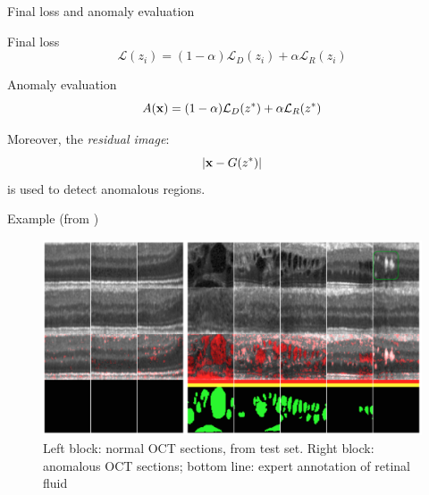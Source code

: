 \documentclass[xcolor=pdftex,dvipsnames,table,mathserif]{beamer}
\begin{document}
\begin{frame}{Final loss and anomaly evaluation}

  \begin{block}{Final loss}
    \[\mathcal{L}(z_i) = (1-\alpha)\mathcal{L}_D(z_i) + \alpha \mathcal{L}_R(z_i) \]
  \end{block}

  \begin{block}{Anomaly evaluation}
    \[A(\mathbf{x}) = (1-\alpha)\mathcal{L}_D(z^*) + \alpha \mathcal{L}_R(z^*) \]

      Moreover, the \emph{residual image}:
      \[
      |\mathbf{x} - G(z^*)|
      \]
      is used to detect anomalous regions.
  \end{block}

\end{frame}


\begin{frame}{Example (from \cite{schlegl_unsupervised_2017})}


  \begin{figure}[ht]
    \centering
    \includegraphics[width=\textwidth]{res_oct}
    \caption{Left block: normal OCT sections, from test set. Right block: anomalous OCT sections; bottom line: expert annotation of retinal fluid}
  \end{figure}

\end{frame}
\end{document}
